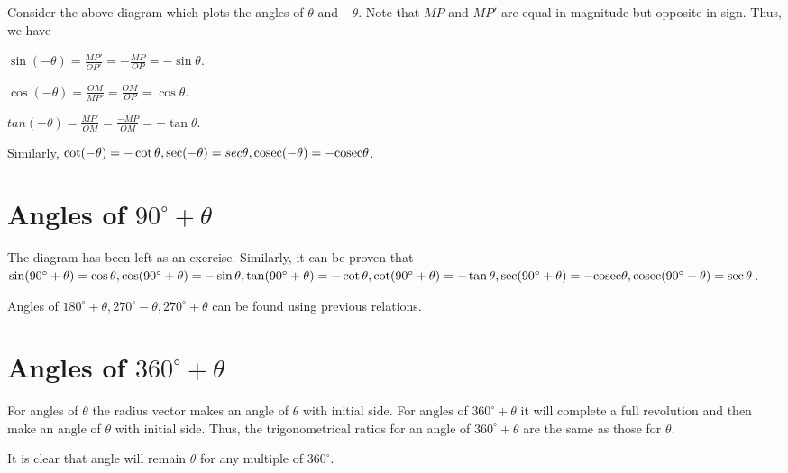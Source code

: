 Consider the above diagram which plots the angles of $\theta$ and $-\theta$. Note that $MP$ and $MP'$ are equal in magnitude but
opposite in sign. Thus, we have

$\sin(-\theta) = \frac{MP'}{OP'} = -\frac{MP}{OP} = -\sin\theta$.

$\cos(-\theta) = \frac{OM}{MP'} = \frac{OM}{OP} = \cos\theta$.

$tan(-\theta) = \frac{MP'}{OM} = \frac{-MP}{OM} = -\tan\theta$.

Similarly, $\cot(-\theta) = -\cot\theta, \sec(-\theta) = sec\theta, {\rm cosec}(-\theta) = -{\rm cosec}\theta$.

\section{Angles of $90^\circ + \theta$}
The diagram has been left as an exercise. Similarly, it can be proven that $\sin(90^\circ + \theta) = \cos\theta, \cos(90^\circ +
\theta) = -\sin\theta, \tan(90^\circ + \theta) = -\cot\theta, \cot(90^\circ + \theta) = -\tan\theta, \sec(90^\circ + \theta) =
-{\rm cosec}\theta, {\rm cosec}(90^\circ + \theta) = \sec\theta$.

Angles of $180^\circ + \theta, 270^\circ - \theta, 270^\circ + \theta$ can be found using previous relations.

\section{Angles of $360^\circ + \theta$}
For angles of $\theta$ the radius vector makes an angle of $\theta$ with initial side. For angles of $360^\circ +
\theta$ it will complete a full revolution and then make an angle of $\theta$ with initial side. Thus, the trigonometrical
ratios for an angle of $360^\circ + \theta$ are the same as those for $\theta$.

It is clear that angle will remain $\theta$ for any multiple of $360^\circ$.

